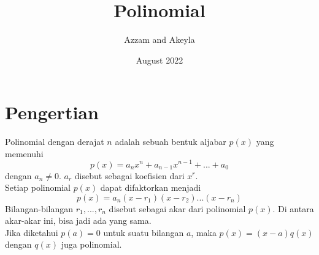 \documentclass[11pt]{scrartcl}
\title{Polinomial}
\author{Azzam and Akeyla}
\date{August 2022}
\begin{document}
\maketitle

\renewcommand*\contentsname{Daftar Isi}
\tableofcontents

\newpage

\section{Pengertian}
Polinomial dengan derajat $n$ adalah sebuah bentuk aljabar $p(x)$ yang memenuhi $$p(x) = a_nx^n + a_{n - 1}x^{n - 1} + ... + a_0$$ dengan $a_n \neq 0$. $a_r$ disebut sebagai koefisien dari $x^r$.\\
Setiap polinomial $p(x)$ dapat difaktorkan menjadi $$p(x) = a_n(x-r_1)(x-r_2)...(x-r_n)$$Bilangan-bilangan $r_1, ..., r_n$ disebut sebagai akar dari polinomial $p(x)$. Di antara akar-akar ini, bisa jadi ada yang sama.\\
Jika diketahui $p(a) = 0$ untuk suatu bilangan $a$, maka $p(x) = (x - a)q(x)$ dengan $q(x)$ juga polinomial.\\
\end{document}
